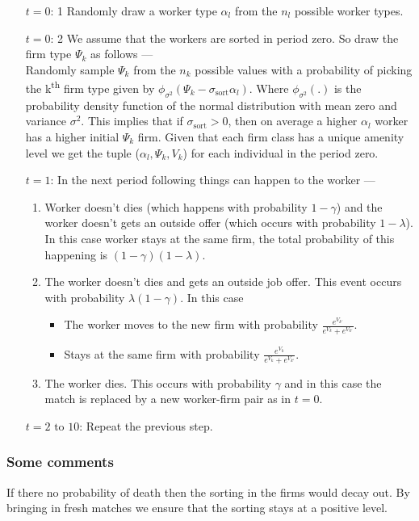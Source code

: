 \documentclass{report}
\numberwithin{equation}{section}
\numberwithin{figure}{section}
\numberwithin{table}{section}
\begin{document}
\begin{enumerate}
  \item[$t=0$: 1] Randomly draw a worker type $\alpha_l$ from the $n_l$ possible worker types.
  \item[$t=0$: 2] We assume that the workers are sorted in period zero. So draw the firm type $\Psi_k$ as follows — \\
  Randomly sample $\Psi_k$ from the $n_k$ possible values with a probability of picking the k\textsuperscript{th} firm type given by $\phi_{\sigma^2}(\Psi_k - \sigma_{\text{sort}} \alpha_l)$. Where $\phi_{\sigma^2}(.)$ is the probability density function of the normal distribution with mean zero and variance $\sigma^2$. This implies that if $\sigma_{\text{sort}} > 0$, then on average a higher $\alpha_l$ worker has a higher initial $\Psi_k$ firm. Given that each firm class has a unique amenity level we get the tuple ($\alpha_l,\Psi_k, V_k$) for each individual in the period zero.
  \item[$t = 1$:] \label{iterator} In the next period following things can happen to the worker —
  \begin{enumerate}
      \item Worker doesn't dies (which happens with probability $1-\gamma$) and the worker doesn't gets an outside offer (which occurs with probability $1-\lambda$). In this case worker stays at the same firm, the total probability of this happening is $(1-\gamma)(1-\lambda)$.
      \item The worker doesn't dies and gets an outside job offer. This event occurs with probability $\lambda (1-\gamma)$. In this case
      \begin{itemize}
        \item The worker moves to the new firm with probability $\frac{e^{V_{k'}}}{e^{V_k} + e^{V_{k'}}}$.
        \item Stays at the same firm with probability $\frac{e^{V_{k}}}{e^{V_k} + e^{V_{k'}}}$.
      \end{itemize}
      \item The worker dies. This occurs with probability $\gamma$ and in this case the match is replaced by a new worker-firm pair as in $t = 0$.
  \end{enumerate}
  \item[$t = 2 \text{ to } 10$: ] Repeat the previous step.
\end{enumerate}

\subsubsection{Some comments}
If there no probability of death then the sorting in the firms would decay out. By bringing in fresh matches we ensure that the sorting stays at a positive level.
\end{document}
